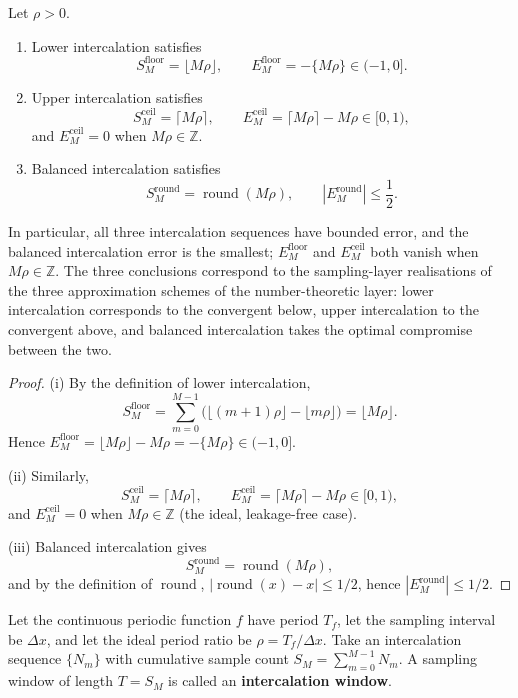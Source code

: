 \begin{theorem}\label{thm:intercalation_error_bound_harmonic}
Let \(\rho>0\).
\begin{enumerate}[label=(\roman*)]
    \item Lower intercalation satisfies
    \[
    S_M^{\mathrm{floor}}=\lfloor M\rho\rfloor,\qquad
    E_M^{\mathrm{floor}}=-\{M\rho\}\in(-1,0].
    \]
    \item Upper intercalation satisfies
    \[
    S_M^{\mathrm{ceil}}=\lceil M\rho\rceil,\qquad
    E_M^{\mathrm{ceil}}=\lceil M\rho\rceil-M\rho\in[0,1),
    \]
    and $E_M^{\mathrm{ceil}}=0$ when $M\rho\in\mathbb Z$.
    \item Balanced intercalation satisfies
    \[
    S_M^{\mathrm{round}}=\operatorname{round}(M\rho),\qquad
    |E_M^{\mathrm{round}}|\le\frac12.
    \]
\end{enumerate}
In particular, all three intercalation sequences have bounded error, and the balanced intercalation error is the smallest; $E_M^{\mathrm{floor}}$ and $E_M^{\mathrm{ceil}}$ both vanish when $M\rho\in\mathbb Z$. The three conclusions correspond to the sampling-layer realisations of the three approximation schemes of the number-theoretic layer: lower intercalation corresponds to the convergent below, upper intercalation to the convergent above, and balanced intercalation takes the optimal compromise between the two.
\end{theorem}

\begin{proof}
(i) By the definition of lower intercalation,
\[
S_M^{\mathrm{floor}}=\sum_{m=0}^{M-1}\bigl(\lfloor (m+1)\rho\rfloor-\lfloor m\rho\rfloor\bigr)=\lfloor M\rho\rfloor.
\]
Hence \(E_M^{\mathrm{floor}}=\lfloor M\rho\rfloor-M\rho=-\{M\rho\}\in(-1,0]\).

(ii) Similarly,
\[
S_M^{\mathrm{ceil}}=\lceil M\rho\rceil,\qquad
E_M^{\mathrm{ceil}}=\lceil M\rho\rceil-M\rho\in[0,1),
\]
and $E_M^{\mathrm{ceil}}=0$ when $M\rho\in\mathbb Z$ (the ideal, leakage-free case).

(iii) Balanced intercalation gives
\[
S_M^{\mathrm{round}}=\operatorname{round}(M\rho),
\]
and by the definition of \(\operatorname{round}\), \(|\operatorname{round}(x)-x|\le 1/2\), hence \(|E_M^{\mathrm{round}}|\le 1/2\).
\end{proof}

\begin{definition}\label{def:intercalation_window_harmonic}
Let the continuous periodic function \(f\) have period \(T_f\), let the sampling interval be \(\Delta x\), and let the ideal period ratio be \(\rho=T_f/\Delta x\). Take an intercalation sequence \(\{N_m\}\) with cumulative sample count \(S_M=\sum_{m=0}^{M-1}N_m\). A sampling window of length \(T=S_M\) is called an \textbf{intercalation window}.
\end{definition}

